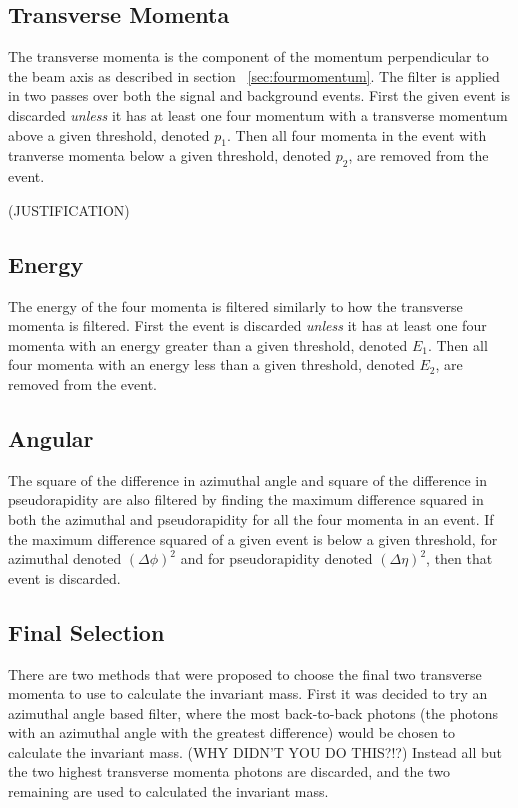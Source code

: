 \documentclass[11pt]{amsart}
\begin{document}
\begin{multicols}{2}
\subsection{Transverse Momenta}

The transverse momenta is the component of the momentum perpendicular to the beam axis as described in section ~\ref{sec:fourmomentum}. The filter is applied in two passes over both the signal and background events. First the given event is discarded \textit{unless} it has at least one four momentum with a transverse momentum above a given threshold, denoted $p_1$. Then all four momenta in the event with tranverse momenta below a given threshold, denoted $p_2$, are removed from the event.

(JUSTIFICATION)

\subsection{Energy}

The energy of the four momenta is filtered similarly to how the transverse momenta is filtered. First the event is discarded \textit{unless} it has at least one four momenta with an energy greater than a given threshold, denoted $E_1$. Then all four momenta with an energy less than a given threshold, denoted $E_2$, are removed from the event.

\subsection{Angular}

The square of the difference in azimuthal angle and square of the difference in pseudorapidity are also filtered by finding the maximum difference squared in both the azimuthal and pseudorapidity for all the four momenta in an event. If the maximum difference squared of a given event is below a given threshold, for azimuthal denoted ${(\Delta \phi)}^2$ and for pseudorapidity denoted ${(\Delta \eta)}^2$, then that event is discarded.

\subsection{Final Selection}

There are two methods that were proposed to choose the final two transverse momenta to use to calculate the invariant mass. First it was decided to try an azimuthal angle based filter, where the most back-to-back photons (the photons with an azimuthal angle with the greatest difference) would be chosen to calculate the invariant mass. (WHY DIDN'T YOU DO THIS?!?) Instead all but the two highest transverse momenta photons are discarded, and the two remaining are used to calculated the invariant mass.



\end{multicols}
\end{document}
